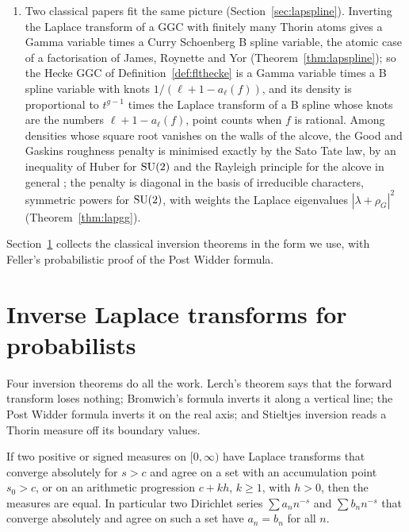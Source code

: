 \begin{enumerate}
\item[(5)] Two classical papers fit the same picture (Section~\ref{sec:lapspline}). Inverting the Laplace transform of a GGC with finitely many Thorin atoms gives a Gamma variable times a Curry Schoenberg B spline variable, the atomic case of a factorisation of James, Roynette and Yor \cite{jamesroynetteyor2008} (Theorem~\ref{thm:lapspline}); so the Hecke GGC of Definition~\ref{def:flthecke} is a Gamma variable times a B spline variable with knots $1/(\ell+1-a_\ell(f))$, and its density is proportional to $t^{g-1}$ times the Laplace transform of a B spline whose knots are the numbers $\ell+1-a_\ell(f)$, point counts when $f$ is rational. Among densities whose square root vanishes on the walls of the alcove, the Good and Gaskins roughness penalty is minimised exactly by the Sato Tate law, by an inequality of Huber for $\mathrm{SU}(2)$ and the Rayleigh principle for the alcove in general \cite{huber1974,berard1980}; the penalty is diagonal in the basis of irreducible characters, symmetric powers for $\mathrm{SU}(2)$, with weights the Laplace eigenvalues $|\lambda+\rho_G|^2$ (Theorem~\ref{thm:lapgg}).
\end{enumerate}
Section~\ref{sec:laptools} collects the classical inversion theorems in the form we use, with Feller's probabilistic proof of the Post Widder formula.

\section{Inverse Laplace transforms for probabilists}\label{sec:laptools}

Four inversion theorems do all the work. Lerch's theorem says that the forward transform loses nothing; Bromwich's formula inverts it along a vertical line; the Post Widder formula inverts it on the real axis; and Stieltjes inversion reads a Thorin measure off its boundary values.

\begin{theorem}\label{thm:laplerch}
If two positive or signed measures on $[0,\infty)$ have Laplace transforms that converge absolutely for $s>c$ and agree on a set with an accumulation point $s_0>c$, or on an arithmetic progression $c+kh$, $k\ge1$, with $h>0$, then the measures are equal. In particular two Dirichlet series $\sum a_nn^{-s}$ and $\sum b_nn^{-s}$ that converge absolutely and agree on such a set have $a_n=b_n$ for all $n$.
\end{theorem}

